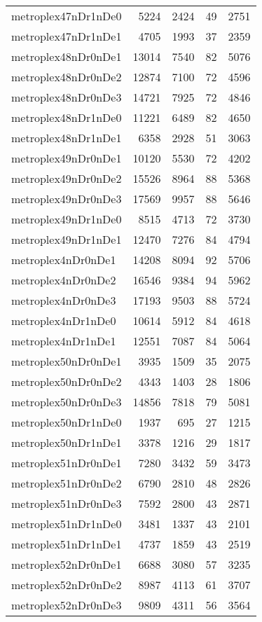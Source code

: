 \documentclass[../../../thesis.tex]{subfiles}
\begin{document}
\begin{longtable}{lrrrr}
metroplex47nDr1nDe0 & 5224 & 2424 & 49 & 2751 \\
metroplex47nDr1nDe1 & 4705 & 1993 & 37 & 2359 \\
metroplex48nDr0nDe1 & 13014 & 7540 & 82 & 5076 \\
metroplex48nDr0nDe2 & 12874 & 7100 & 72 & 4596 \\
metroplex48nDr0nDe3 & 14721 & 7925 & 72 & 4846 \\
metroplex48nDr1nDe0 & 11221 & 6489 & 82 & 4650 \\
metroplex48nDr1nDe1 & 6358 & 2928 & 51 & 3063 \\
metroplex49nDr0nDe1 & 10120 & 5530 & 72 & 4202 \\
metroplex49nDr0nDe2 & 15526 & 8964 & 88 & 5368 \\
metroplex49nDr0nDe3 & 17569 & 9957 & 88 & 5646 \\
metroplex49nDr1nDe0 & 8515 & 4713 & 72 & 3730 \\
metroplex49nDr1nDe1 & 12470 & 7276 & 84 & 4794 \\
metroplex4nDr0nDe1 & 14208 & 8094 & 92 & 5706 \\
metroplex4nDr0nDe2 & 16546 & 9384 & 94 & 5962 \\
metroplex4nDr0nDe3 & 17193 & 9503 & 88 & 5724 \\
metroplex4nDr1nDe0 & 10614 & 5912 & 84 & 4618 \\
metroplex4nDr1nDe1 & 12551 & 7087 & 84 & 5064 \\
metroplex50nDr0nDe1 & 3935 & 1509 & 35 & 2075 \\
metroplex50nDr0nDe2 & 4343 & 1403 & 28 & 1806 \\
metroplex50nDr0nDe3 & 14856 & 7818 & 79 & 5081 \\
metroplex50nDr1nDe0 & 1937 & 695 & 27 & 1215 \\
metroplex50nDr1nDe1 & 3378 & 1216 & 29 & 1817 \\
metroplex51nDr0nDe1 & 7280 & 3432 & 59 & 3473 \\
metroplex51nDr0nDe2 & 6790 & 2810 & 48 & 2826 \\
metroplex51nDr0nDe3 & 7592 & 2800 & 43 & 2871 \\
metroplex51nDr1nDe0 & 3481 & 1337 & 43 & 2101 \\
metroplex51nDr1nDe1 & 4737 & 1859 & 43 & 2519 \\
metroplex52nDr0nDe1 & 6688 & 3080 & 57 & 3235 \\
metroplex52nDr0nDe2 & 8987 & 4113 & 61 & 3707 \\
metroplex52nDr0nDe3 & 9809 & 4311 & 56 & 3564 \\

\end{longtable}
\end{document}
